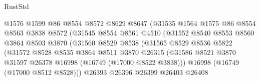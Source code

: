 \begin{lexlean}{RustStd}
\begin{coremodule}
                                  @1576
                                  @1599
                                  @86
                                  @8554
                                  @8572
                                  @8629
                                  @8647
                                  (@31535
                                    @1564
                                    @1575
                                    @86
                                    @8554
                                    @8563
                                    @3838
                                    @8572
                                    (@31545
                                      @8554
                                      @8561
                                      @4510
                                      (@31552
                                        @8540
                                        @8553
                                        @8560
                                        @3864
                                        @8503
                                        @3870
                                        (@31560
                                          @8529
                                          @8538
                                          (@31565
                                            @8529
                                            @8536
                                            @5822
                                            (@31572
                                              @8528
                                              @8535
                                              @3864
                                              @8511
                                              @3870
                                              @26315
                                              (@31586
                                                @8521
                                                @3870
                                                @31597
                                                @26378
                                                @16998
                                                (@16749 (@17000 @8522 @3838)))
                                              @16998
                                              (@16749 (@17000 @8512 @8528)))
                                            @26393
                                            @26396
                                            @26399
                                            @26403
                                            @26408

\end{coremodule}
\end{lexlean}
